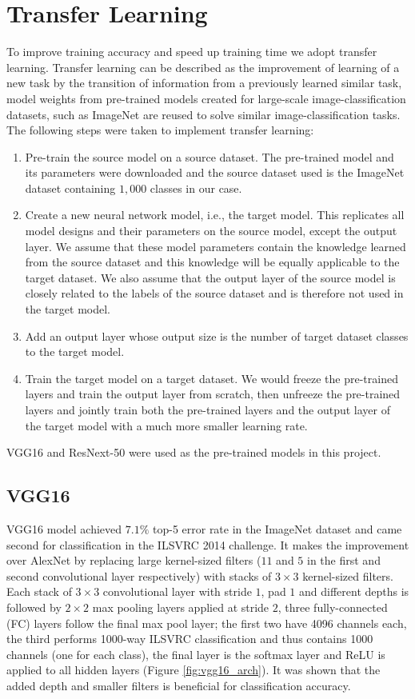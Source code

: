 \documentclass[12pt]{report}
\numberwithin{equation}{section}
\begin{document}
\section{Transfer Learning}
To improve training accuracy and speed up training time we adopt transfer learning. Transfer learning can be described as the improvement of learning of a new task by the transition of information from a previously learned similar task, model weights from pre-trained models created for large-scale image-classification datasets, such as ImageNet are reused to solve similar image-classification tasks. The following steps were taken to implement transfer learning:
\begin{enumerate}
\item Pre-train the source model on a source dataset. The pre-trained model and its parameters were downloaded and the source dataset used is the ImageNet dataset containing $1,000$ classes in our case.
\item Create a new neural network model, i.e., the target model. This replicates all model designs and their parameters on the source model, except the output layer. We assume that these model parameters contain the knowledge learned from the source dataset and this knowledge will be equally applicable to the target dataset. We also assume that the output layer of the source model is closely related to the labels of the source dataset and is therefore not used in the target model.
\item Add an output layer whose output size is the number of target dataset classes to the target model.
\item Train the target model on a target dataset. We would freeze the pre-trained layers and train the output layer from scratch, then unfreeze the pre-trained layers and jointly train both the pre-trained layers and the output layer of the target model with a much more smaller learning rate.
\end{enumerate} \noindent
VGG16 and ResNext-50 were used as the pre-trained models in this project. 

\subsection{VGG16}
VGG16 {\cite{simonyan2015deep}} model achieved $7.1\%$ top-5 error rate in the ImageNet dataset and came second for classification in the ILSVRC 2014 challenge. It makes the improvement over AlexNet {\cite{Krizhevsky}} by replacing large kernel-sized filters ($11$ and $5$ in the first and second convolutional layer respectively) with stacks of $3 \times 3$ kernel-sized filters. Each stack of  $3 \times 3$ convolutional layer with stride $1$, pad $1$ and different depths is followed by $2 \times 2$ max pooling layers applied at stride $2$, three fully-connected (FC) layers follow the final max pool layer; the first two have 4096 channels each, the third performs 1000-way ILSVRC classification and thus contains 1000 channels (one for each class), the final layer is the softmax layer and ReLU is applied to all hidden layers (Figure \ref{fig:vgg16_arch}). It was shown that the added depth and smaller filters is beneficial for classification accuracy.
\end{document}
